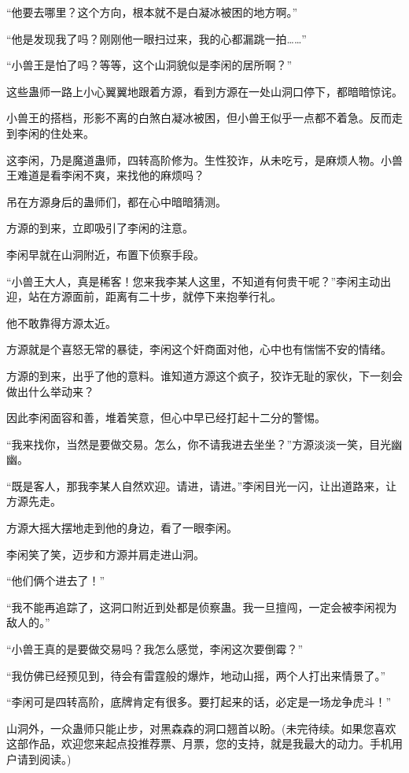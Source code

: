 \begin{this_body}
“他要去哪里？这个方向，根本就不是白凝冰被困的地方啊。”

“他是发现我了吗？刚刚他一眼扫过来，我的心都漏跳一拍……”

“小兽王是怕了吗？等等，这个山洞貌似是李闲的居所啊？”

这些蛊师一路上小心翼翼地跟着方源，看到方源在一处山洞口停下，都暗暗惊诧。

小兽王的搭档，形影不离的白煞白凝冰被困，但小兽王似乎一点都不着急。反而走到李闲的住处来。

这李闲，乃是魔道蛊师，四转高阶修为。生性狡诈，从未吃亏，是麻烦人物。小兽王难道是看李闲不爽，来找他的麻烦吗？

吊在方源身后的蛊师们，都在心中暗暗猜测。

方源的到来，立即吸引了李闲的注意。

李闲早就在山洞附近，布置下侦察手段。

“小兽王大人，真是稀客！您来我李某人这里，不知道有何贵干呢？”李闲主动出迎，站在方源面前，距离有二十步，就停下来抱拳行礼。

他不敢靠得方源太近。

方源就是个喜怒无常的暴徒，李闲这个奸商面对他，心中也有惴惴不安的情绪。

方源的到来，出乎了他的意料。谁知道方源这个疯子，狡诈无耻的家伙，下一刻会做出什么举动来？

因此李闲面容和善，堆着笑意，但心中早已经打起十二分的警惕。

“我来找你，当然是要做交易。怎么，你不请我进去坐坐？”方源淡淡一笑，目光幽幽。

“既是客人，那我李某人自然欢迎。请进，请进。”李闲目光一闪，让出道路来，让方源先走。

方源大摇大摆地走到他的身边，看了一眼李闲。

李闲笑了笑，迈步和方源并肩走进山洞。

“他们俩个进去了！”

“我不能再追踪了，这洞口附近到处都是侦察蛊。我一旦擅闯，一定会被李闲视为敌人的。”

“小兽王真的是要做交易吗？我怎么感觉，李闲这次要倒霉？”

“我仿佛已经预见到，待会有雷霆般的爆炸，地动山摇，两个人打出来情景了。”

“李闲可是四转高阶，底牌肯定有很多。要打起来的话，必定是一场龙争虎斗！”

山洞外，一众蛊师只能止步，对黑森森的洞口翘首以盼。(未完待续。如果您喜欢这部作品，欢迎您来起点投推荐票、月票，您的支持，就是我最大的动力。手机用户请到阅读。)

\end{this_body}

